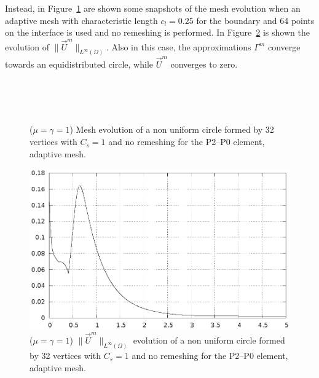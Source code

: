 \documentclass[a4paper,12pt,onecolumn]{article}
\begin{document}
Instead, in Figure~\ref{fig:nonuniform_bubble_64_coarse_smooth} are shown some snapshots of the mesh evolution when an adaptive mesh with characteristic length $c_l=0.25$ for the boundary and 64 points on the interface is used and no remeshing is performed. In Figure~\ref{fig:nonuniform_bubble_velocity_64_coarse_smooth} is shown the evolution of $\|\vec U^m\|_{L^\infty(\Omega)}$. Also in this case, the approximations $\Gamma^m$ converge towards an equidistributed circle, while $\vec U^m$ converges to zero.
\begin{figure}[htbp]
  \centering
  \\
  \quad
  \\
  \quad
  \\
  \caption{($\mu=\gamma=1$) Mesh evolution of a non uniform circle formed by 32 vertices with $C_s=1$ and no remeshing for the P2--P0 element, adaptive mesh.}
  \label{fig:nonuniform_bubble_64_coarse_smooth}
\end{figure}

\begin{figure}[htbp]
  \centering
  \includegraphics[width=.45\textwidth]{figures/nonuniform_bubble_velocity_64_coarse_smooth.ps}
  \caption{($\mu=\gamma=1$) $\|\vec U^m\|_{L^\infty(\Omega)}$ evolution of a non uniform circle formed by 32 vertices with $C_s=1$ and no remeshing for the P2--P0 element, adaptive mesh.}
  \label{fig:nonuniform_bubble_velocity_64_coarse_smooth}
\end{figure}
\end{document}
